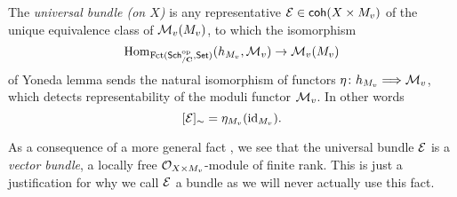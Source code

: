 \begin{definition}
    The \emph{universal bundle (on $X$)} is any representative $\mathcal E \in \mathsf{coh}(X \times M_v)$ of the unique equivalence class of $\mathcal M_v(M_v)$, to which the isomorphism 
    \[
        \mathrm{Hom}_{\operatorname{Fct(\mathsf{Sch}_{/\mathbf C}^{\text{op}}, \mathsf{Set})}}(h_{M_v}, \mathcal M_v) \to \mathcal M_v(M_v)
    \]
    of Yoneda lemma sends the natural isomorphism of functors $\eta \colon h_{M_v} \Longrightarrow \mathcal M_v$, which detects representability of the moduli functor $\mathcal M_v$. In other words 
    \[
        [\mathcal E]_\sim = \eta_{M_v}(\operatorname{id}_{{M_v}}).
    \]
\end{definition}

\begin{remark}
    As a consequence of a more general fact \cite[\S 6.1, Remark 6.1.9]{HuybrechtsLehn2010}, we see that the universal bundle $\mathcal E$ is a \emph{vector bundle}, \ie a locally free ${\mathcal{O}_{X \times M_v}}$-module of finite rank. This is just a justification for why we call $\mathcal E$ a bundle as we will never actually use this fact. 
\end{remark}


